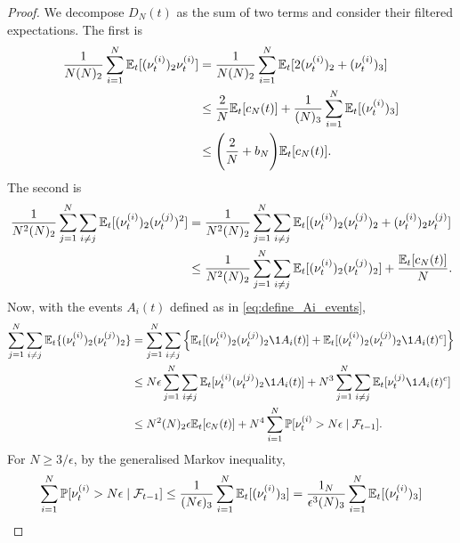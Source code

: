 \begin{proof}
We decompose $D_N(t)$ as the sum of two terms and consider their filtered expectations. The first is
\begin{align}
\frac{ 1 }{ N ( N )_2 } \sum_{ i = 1 }^N \mathbb{E}_t[ ( \nu_t^{(i)} )_2 \nu_t^{(i)} ] 
&= \frac{ 1 }{ N ( N )_2 } \sum_{ i = 1 }^N 
        \mathbb{E}_t[ 2 ( \nu_t^{(i)} )_2 + ( \nu_t^{(i)} )_3] \notag\\
&\leq \frac{ 2 }{ N } \mathbb{E}_t[ c_N( t )] + \frac{ 1 }{ ( N )_3 } \sum_{ i = 1 }^N 
        \mathbb{E}_t[ ( \nu_t^{(i)} )_3 ] \notag\\
&\leq \Bigg(\frac{ 2 }{ N } + b_N \Bigg) \mathbb{E}_t[ c_N( t ) ]. \label{DN_part_1}
\end{align}
The second is
\begin{align}
\frac{ 1 }{ N^2 ( N )_2 } \sum_{ j=1 }^N \sum_{ i \neq j } 
        \mathbb{E}_t[ ( \nu_t^{(i)} )_2 ( \nu_t^{(j)} )^2] 
&= \frac{ 1 }{ N^2 ( N )_2 } \sum_{ j=1 }^N \sum_{ i \neq j } 
        \mathbb{E}_t[ ( \nu_t^{(i)} )_2 ( \nu_t^{(j)} )_2 + ( \nu_t^{(i)} )_2 \nu_t^{(j)} ] \notag\\
&\leq \frac{ 1 }{ N^2 ( N )_2 } \sum_{ j=1 }^N \sum_{ i \neq j } 
        \mathbb{E}_t[ ( \nu_t^{(i)} )_2 ( \nu_t^{(j)} )_2 ] + \frac{ \mathbb{E}_t[ c_N( t ) ] }{ N } .         
        \label{DN_part_2}
\end{align}
Now, with the events $A_i(t)$ defined as in \eqref{eq:define_Ai_events},
\begin{align}
\sum_{ j=1 }^N \sum_{ i \neq j } \Et\{ ( \nu_t^{(i)} )_2 ( \nu_t^{(j)} )_2\} 
&= \sum_{ j=1 }^N \sum_{ i \neq j } 
        \Big\{ \Et[ ( \nu_t^{(i)} )_2 ( \nu_t^{(j)} )_2 \1{ A_i(t) } ]
        + \Et[ ( \nu_t^{(i)} )_2 ( \nu_t^{(j)} )_2 \1{ A_i(t)^c } ] \Big\} \notag\\
&\leq N \epsilon \sum_{ j=1 }^N \sum_{ i \neq j } 
        \Et[ \nu_t^{(i)} ( \nu_t^{(j)} )_2 \1{ A_i(t) } ] 
        + N^3 \sum_{ j=1 }^N \sum_{ i \neq j } \Et[ \nu_t^{(j)} \1{ A_i(t)^c } ] \notag\\
&\leq N^2 ( N )_2 \epsilon \Et[ c_N( t )] + N^4 \sum_{ i = 1 }^N 
        \Prob[ \nu_t^{(i)} > N \epsilon \mid \mathcal{F}_{t-1} ] . \label{DN_part_3}
\end{align}
For $N \geq 3 / \epsilon$, by the generalised Markov inequality,
\begin{align}\label{markovs_ineq}
\sum_{ i = 1 }^N \Prob[ \nu_t^{(i)} > N \epsilon \mid \mathcal{F}_{t-1} ] 
&\leq \frac{ 1 }{ ( N \epsilon )_3 } \sum_{ i = 1 }^N \Et[ ( \nu_t^{(i)} )_3 ]
        = \frac{ \ON }{ \epsilon^3 ( N )_3 } 
        \sum_{ i = 1 }^N \Et[ ( \nu_t^{(i)} )_3 ] \notag \\

\end{align}
\end{proof}
